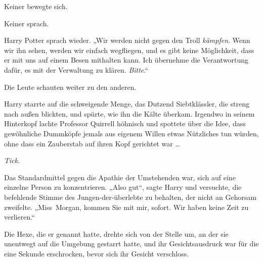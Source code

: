 Keiner bewegte sich.

Keiner sprach.

Harry Potter sprach wieder.
„Wir werden nicht gegen den Troll \emph{kämpfen}. Wenn wir ihn sehen, werden wir einfach wegfliegen, und es gibt keine Möglichkeit, dass er mit uns auf einem Besen mithalten kann. Ich übernehme die Verantwortung dafür, es mit der Verwaltung zu klären. \emph{Bitte}.“

Die Leute schauten weiter zu den anderen.

\later

Harry starrte auf die schweigende Menge, das Dutzend Siebtklässler, die streng nach außen blickten, und spürte, wie ihn die Kälte überkam. Irgendwo in seinem Hinterkopf lachte Professor Quirrell höhnisch und spottete über die Idee, dass gewöhnliche Dummköpfe jemals aus eigenem Willen etwas Nützliches tun würden, ohne dass ein Zauberstab auf ihren Kopf gerichtet war …

\emph{Tick.}

Das Standardmittel gegen die Apathie der Umstehenden war, sich auf eine einzelne Person zu konzentrieren.
„Also gut“, sagte Harry und versuchte, die befehlende Stimme des Jungen-der-überlebte zu behalten, der nicht an Gehorsam zweifelte.
„Miss~Morgan, kommen Sie mit mir, sofort. Wir haben keine Zeit zu verlieren.“

Die Hexe, die er genannt hatte, drehte sich von der Stelle um, an der sie unentwegt auf die Umgebung gestarrt hatte, und ihr Gesichtsausdruck war für die eine Sekunde erschrocken, bevor sich ihr Gesicht verschloss.

